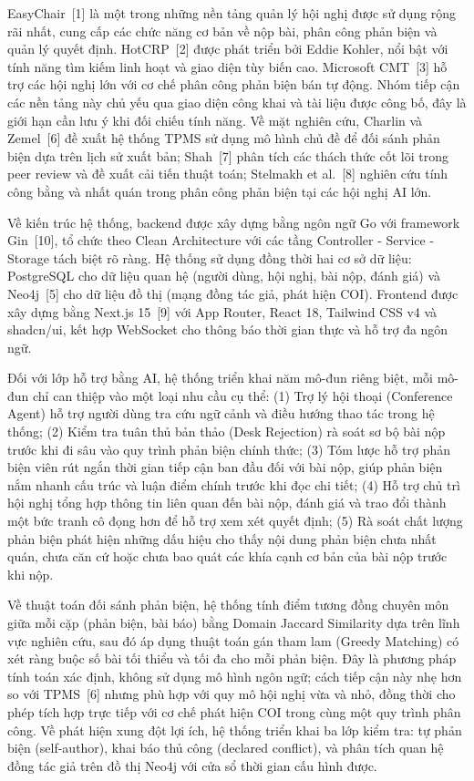 EasyChair~[1] là một trong những nền tảng quản lý hội nghị được sử dụng rộng rãi nhất, cung cấp các chức năng cơ bản về nộp bài, phân công phản biện và quản lý quyết định. HotCRP~[2] được phát triển bởi Eddie Kohler, nổi bật với tính năng tìm kiếm linh hoạt và giao diện tùy biến cao. Microsoft CMT~[3] hỗ trợ các hội nghị lớn với cơ chế phân công phản biện bán tự động. Nhóm tiếp cận các nền tảng này chủ yếu qua giao diện công khai và tài liệu được công bố, đây là giới hạn cần lưu ý khi đối chiếu tính năng. Về mặt nghiên cứu, Charlin và Zemel~[6] đề xuất hệ thống TPMS sử dụng mô hình chủ đề để đối sánh phản biện dựa trên lịch sử xuất bản; Shah~[7] phân tích các thách thức cốt lõi trong peer review và đề xuất cải tiến thuật toán; Stelmakh et al.~[8] nghiên cứu tính công bằng và nhất quán trong phân công phản biện tại các hội nghị AI lớn.

Về kiến trúc hệ thống, backend được xây dựng bằng ngôn ngữ Go với framework Gin~[10], tổ chức theo Clean Architecture với các tầng Controller - Service - Storage tách biệt rõ ràng. Hệ thống sử dụng đồng thời hai cơ sở dữ liệu: PostgreSQL cho dữ liệu quan hệ (người dùng, hội nghị, bài nộp, đánh giá) và Neo4j~[5] cho dữ liệu đồ thị (mạng đồng tác giả, phát hiện COI). Frontend được xây dựng bằng Next.js 15~[9] với App Router, React 18, Tailwind CSS v4 và shadcn/ui, kết hợp WebSocket cho thông báo thời gian thực và hỗ trợ đa ngôn ngữ.

Đối với lớp hỗ trợ bằng AI, hệ thống triển khai năm mô-đun riêng biệt, mỗi mô-đun chỉ can thiệp vào một loại nhu cầu cụ thể: (1) Trợ lý hội thoại (Conference Agent) hỗ trợ người dùng tra cứu ngữ cảnh và điều hướng thao tác trong hệ thống; (2) Kiểm tra tuân thủ bản thảo (Desk Rejection) rà soát sơ bộ bài nộp trước khi đi sâu vào quy trình phản biện chính thức; (3) Tóm lược hỗ trợ phản biện viên rút ngắn thời gian tiếp cận ban đầu đối với bài nộp, giúp phản biện nắm nhanh cấu trúc và luận điểm chính trước khi đọc chi tiết; (4) Hỗ trợ chủ trì hội nghị tổng hợp thông tin liên quan đến bài nộp, đánh giá và trao đổi thành một bức tranh cô đọng hơn để hỗ trợ xem xét quyết định; (5) Rà soát chất lượng phản biện phát hiện những dấu hiệu cho thấy nội dung phản biện chưa nhất quán, chưa căn cứ hoặc chưa bao quát các khía cạnh cơ bản của bài nộp trước khi nộp.

Về thuật toán đối sánh phản biện, hệ thống tính điểm tương đồng chuyên môn giữa mỗi cặp (phản biện, bài báo) bằng Domain Jaccard Similarity dựa trên lĩnh vực nghiên cứu, sau đó áp dụng thuật toán gán tham lam (Greedy Matching) có xét ràng buộc số bài tối thiểu và tối đa cho mỗi phản biện. Đây là phương pháp tính toán xác định, không sử dụng mô hình ngôn ngữ; cách tiếp cận này nhẹ hơn so với TPMS~[6] nhưng phù hợp với quy mô hội nghị vừa và nhỏ, đồng thời cho phép tích hợp trực tiếp với cơ chế phát hiện COI trong cùng một quy trình phân công. Về phát hiện xung đột lợi ích, hệ thống triển khai ba lớp kiểm tra: tự phản biện (self-author), khai báo thủ công (declared conflict), và phân tích quan hệ đồng tác giả trên đồ thị Neo4j với cửa sổ thời gian cấu hình được.

